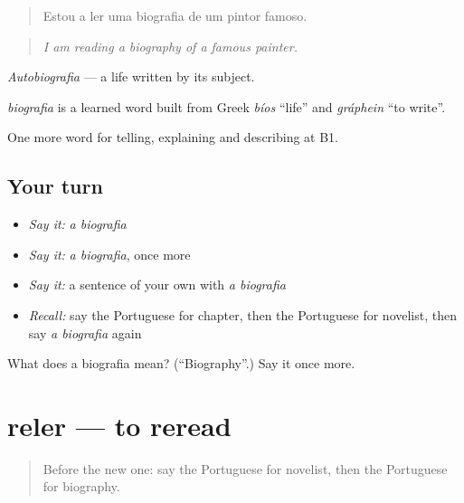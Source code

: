 \begin{quote}
Estou a ler uma biografia de um pintor famoso.
\end{quote}

\begin{quote}
\emph{I am reading a biography of a famous painter.}
\end{quote}

\emph{Autobiografia} — a life written by its subject.

\begin{cousinweb}
\emph{biografia} is a learned word built from Greek \emph{bíos} \textquotedblleft{}life\textquotedblright{} and \emph{gráphein} \textquotedblleft{}to write\textquotedblright{}.
\end{cousinweb}

\begin{grammarlens}[title={What you've built}]
One more word for telling, explaining and describing at B1.
\end{grammarlens}

\subsection*{Your turn}
\begin{itemize}
\raggedright
  \item \emph{Say it:} \emph{a biografia}
  \item \emph{Say it:} \emph{a biografia}, once more
  \item \emph{Say it:} a sentence of your own with \emph{a biografia}
  \item \emph{Recall:} say the Portuguese for chapter, then the Portuguese for novelist, then say \emph{a biografia} again
\end{itemize}

\begin{tcolorbox}[breakable,colback=teal!4,colframe=teal!35!black,title={Before you move on}]
What does a biografia mean? (\textquotedblleft{}Biography\textquotedblright{}.) Say it once more.
\end{tcolorbox}
\section[reler]{reler — to reread}

\label{lesson:PT-C523-reler}



\begin{quote}
Before the new one: say the Portuguese for novelist, then the Portuguese for biography.
\end{quote}

